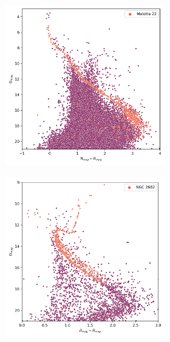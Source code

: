 \documentclass[11pt, a4paper, english]{book}
\begin{document}
\begin{figure}[htbp]
  \centering
  \begin{subfigure}{0.9\textwidth}
    \centering
    \begin{subfigure}[t]{0.45\textwidth}
      \centering
      \includegraphics[width=\textwidth]{../figures/melotte_22/hr_diagram_melotte_22.png}
    \end{subfigure}
    \hfill
    \begin{subfigure}[t]{0.45\textwidth}
      \centering
      \includegraphics[width=\textwidth]{../figures/ngc_2682/hr_diagram_ngc_2682.png}

\end{subfigure}
\end{subfigure}
\end{figure}
\end{document}
